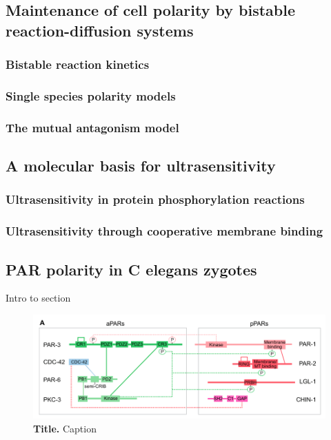 \documentclass[12pt]{"article"}
\newcommand{\mycaption}[2]{\caption[#1]{\textbf{#1.} #2}}
\begin{document}
\clearpage
\subsection{Maintenance of cell polarity by bistable reaction-diffusion systems}
\subsubsection{Bistable reaction kinetics}
\subsubsection{Single species polarity models}
\subsubsection{The mutual antagonism model}

\clearpage
\subsection{A molecular basis for ultrasensitivity}
\subsubsection{Ultrasensitivity in protein phosphorylation reactions}
\subsubsection{Ultrasensitivity through cooperative membrane binding}

\clearpage
\subsection{PAR polarity in C elegans zygotes}

Intro to section

\begin{figure}[!h]
\includegraphics[scale=0.9]{par_proteins_schematic}
\setlength{\abovecaptionskip}{20pt}
\centering
\mycaption{Title}{Caption}
\label{fig:par_proteins_schematic}
\end{figure}
\end{document}
